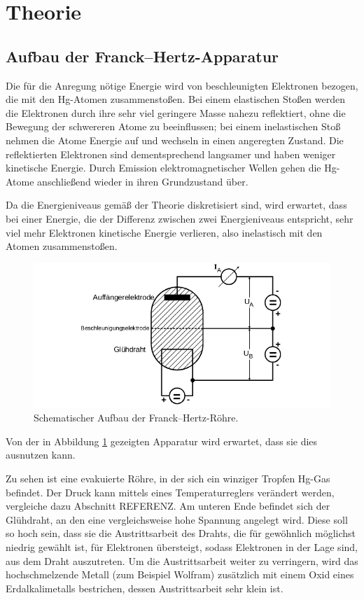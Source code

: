 \section{Theorie}
\label{sec:Theorie}

\subsection{Aufbau der Franck--Hertz-Apparatur}

Die für die Anregung nötige Energie wird von beschleunigten Elektronen bezogen, die mit den Hg-Atomen zusammenstoßen. 
Bei einem elastischen Stoßen werden die Elektronen durch ihre sehr viel geringere Masse nahezu reflektiert, ohne die Bewegung der 
schwereren Atome zu beeinflussen; bei einem inelastischen Stoß nehmen die Atome Energie auf und wechseln in einen angeregten Zustand.
Die reflektierten Elektronen sind dementsprechend langsamer und haben weniger kinetische Energie. Durch Emission elektromagnetischer Wellen 
gehen die Hg-Atome anschließend wieder in ihren Grundzustand über. 

Da die Energieniveaus gemäß der Theorie diskretisiert sind, wird erwartet, dass bei einer Energie, die der Differenz zwischen 
zwei Energieniveaus entspricht, sehr viel mehr Elektronen kinetische Energie verlieren, also inelastisch mit den Atomen zusammenstoßen. 

\begin{figure}
    \centering
    \includegraphics[width=\textwidth]{plots/schemaAufbau.png}
    \caption{Schematischer Aufbau der Franck--Hertz-Röhre\cite{Versuchsanleitung}.}
    \label{fig:schemaAufbau}
\end{figure}

Von der in Abbildung \ref{fig:schemaAufbau} gezeigten Apparatur wird erwartet, dass sie dies ausnutzen kann. 

Zu sehen ist eine evakuierte Röhre, in der sich ein winziger Tropfen Hg-Gas befindet. 
Der Druck kann mittels eines Temperaturreglers verändert werden, vergleiche dazu Abschnitt REFERENZ. 
Am unteren Ende befindet sich der Glühdraht, an den eine vergleichsweise hohe Spannung angelegt wird. 
Diese soll so hoch sein, dass sie die Austrittsarbeit des Drahts, die für gewöhnlich möglichst niedrig gewählt ist, 
für Elektronen übersteigt, sodass Elektronen in der Lage sind, aus dem Draht auszutreten. 
Um die Austrittsarbeit weiter zu verringern, wird das hochschmelzende Metall (zum Beispiel Wolfram) zusätzlich mit 
einem Oxid eines Erdalkalimetalls bestrichen, dessen Austrittsarbeit sehr klein ist. 

